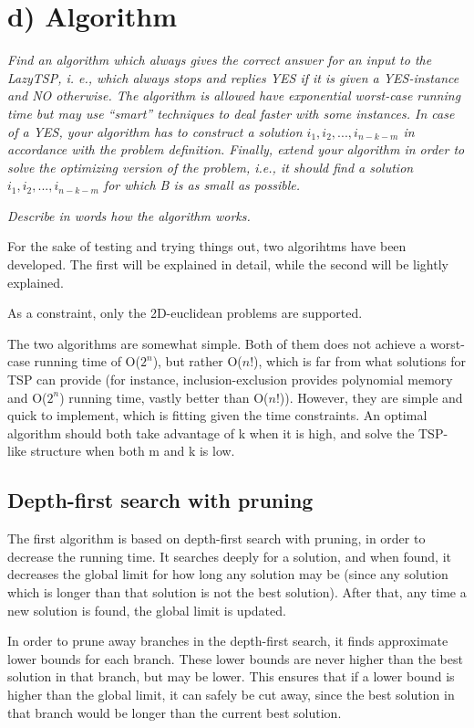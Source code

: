 
\section{d) Algorithm}

\textit{Find an algorithm which always gives the correct answer for an input to the
LazyTSP, i. e., which always stops and replies YES if it is given a YES-instance
and NO otherwise. The algorithm is allowed have exponential worst-case running
time but may use “smart” techniques to deal faster with some instances. In case of
a YES, your algorithm has to construct a solution \(i_1, i_2, ..., i_{n-k-m}\) in accordance
with the problem definition. Finally, extend your algorithm in order to solve the
optimizing version of the problem, i.e., it should find a solution \(i_1, i_2, ..., i_{n-k-m}\)
for which B is as small as possible.}

\textit{Describe in words how the algorithm works.}

For the sake of testing and trying things out, two algorihtms have been developed.
The first will be explained in detail, while the second will be lightly explained.

As a constraint, only the 2D-euclidean problems are supported.

The two algorithms are somewhat simple. Both of them does not achieve
a worst-case running time of O(\(2^n\)), but rather O(\(n!\)), which
is far from what solutions for TSP can provide (for instance, inclusion-exclusion provides
polynomial memory and O(\(2^n\)) running time, vastly better than O(\(n!\))).
However, they are simple
and quick to implement, which is fitting given the time constraints.
An optimal algorithm should both take advantage of k when it is high,
and solve the TSP-like structure when both m and k is low.

\subsection{Depth-first search with pruning}

The first algorithm is based on depth-first search with pruning,
in order to decrease the running time. It searches deeply for a solution,
and when found, it decreases the global limit for how long any solution may be
(since any solution which is longer than that solution is not the best solution).
After that, any time a new solution is found, the global limit is updated.

In order to prune away branches in the depth-first search, it finds approximate lower bounds
for each branch. These lower bounds are never higher than the best solution
in that branch, but may be lower. This ensures that if a lower bound is higher
than the global limit, it can safely be cut away, since the best solution in
that branch would be longer than the current best solution.

